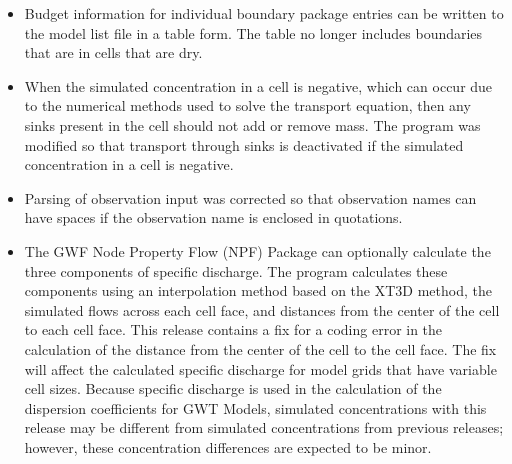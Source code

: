\documentclass[11pt,twoside,twocolumn]{usgsreport}
\begin{document}
\begin{itemize}
\begin{itemize}
	        \item Budget information for individual boundary package entries can be written to the model list file in a table form.  The table no longer includes boundaries that are in cells that are dry.
	        \item When the simulated concentration in a cell is negative, which can occur due to the numerical methods used to solve the transport equation, then any sinks present in the cell should not add or remove mass.  The program was modified so that transport through sinks is deactivated if the simulated concentration in a cell is negative.
	        \item Parsing of observation input was corrected so that observation names can have spaces if the observation name is enclosed in quotations.
	        \item The GWF Node Property Flow (NPF) Package can optionally calculate the three components of specific discharge.  The program calculates these components using an interpolation method based on the XT3D method, the simulated flows across each cell face, and distances from the center of the cell to each cell face.  This release contains a fix for a coding error in the calculation of the distance from the center of the cell to the cell face.  The fix will affect the calculated specific discharge for model grids that have variable cell sizes.  Because specific discharge is used in the calculation of the dispersion coefficients for GWT Models, simulated concentrations with this release may be different from simulated concentrations from previous releases; however, these concentration differences are expected to be minor.
	\end{itemize}


\end{itemize}
\end{document}
